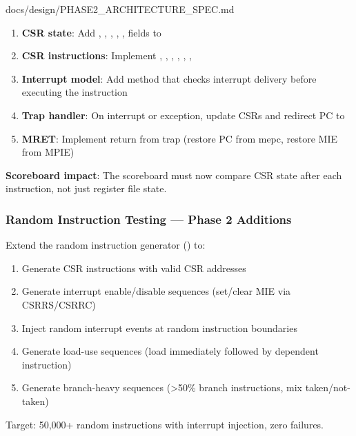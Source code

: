\begin{relocated}{docs/design/PHASE2_ARCHITECTURE_SPEC.md}
\begin{enumerate}
\def\labelenumi{\arabic{enumi}.}
\tightlist
\item
  \textbf{CSR state}: Add , , ,
  , ,  fields to 
\item
  \textbf{CSR instructions}: Implement , ,
  , , , , 
\item
  \textbf{Interrupt model}: Add
   method that checks
  interrupt delivery before executing the instruction
\item
  \textbf{Trap handler}: On interrupt or exception, update CSRs and
  redirect PC to 
\item
  \textbf{MRET}: Implement return from trap (restore PC from mepc,
  restore MIE from MPIE)
\end{enumerate}

\textbf{Scoreboard impact}: The scoreboard must now compare CSR state
after each instruction, not just register file state.

\subsubsection{Random Instruction Testing --- Phase 2 Additions}\label{ds:ch:phase2-architecture:75-random-instruction-testing-phase-2-additions}

Extend the random instruction generator
() to:

\begin{enumerate}
\def\labelenumi{\arabic{enumi}.}
\tightlist
\item
  Generate CSR instructions with valid CSR addresses
\item
  Generate interrupt enable/\allowbreak{}disable sequences
  (set/\allowbreak{}clear MIE via CSRRS/\allowbreak{}CSRRC)
\item
  Inject random interrupt events at random instruction boundaries
\item
  Generate load-use sequences (load immediately followed by dependent
  instruction)
\item
  Generate branch-heavy sequences (\textgreater50\% branch instructions,
  mix taken/\allowbreak{}not-taken)
\end{enumerate}

Target: 50,000+ random instructions with interrupt injection, zero
failures.


\end{relocated}
